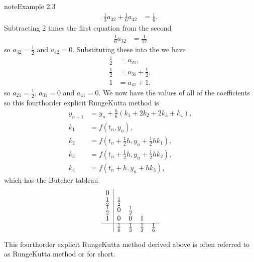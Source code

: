 \documentclass[letterpaper,10pt,english]{jupyterBook}
\begin{document}
\begin{sphinxadmonition}{note}{Example 2.3}
\begin{align*}
    \frac{1}{3}a_{32} + \frac{1}{6}a_{42} &= \frac{1}{6}.
\end{align*}
\sphinxAtStartPar
Subtracting 2 times the first equation from the second
\begin{align*}
    \frac{1}{6}a_{32} &= \frac{1}{12}
\end{align*}
\sphinxAtStartPar
so \(a_{32} = \frac{1}{2}\) and \(a_{42} = 0\). Substituting these into the {\hyperref[\detokenize{2_ERKs/2.2_RK4_Derivation:row-sum-condition}]{}} we have
\begin{align*}
    \frac{1}{2} &= a_{21}, \\
    \frac{1}{2} &= a_{31} + \frac{1}{2}, \\
    1 &= a_{41} + 1,
\end{align*}
\sphinxAtStartPar
so \(a_{21} = \frac{1}{2}\), \(a_{31} = 0\) and \(a_{41} = 0\). We now have the values of all of the coefficients so this fourth\sphinxhyphen{}order explicit Runge\sphinxhyphen{}Kutta method is
\begin{align*}
    y_{n+1} &=y_n +\frac{h}{6}(k_1 +2 k_2 +2k_3 +k_4 ),\\
    k_1 &=f(t_n ,y_n ),\\
    k_2 &=f(t_n +\tfrac{1}{2}h,y_n +\tfrac{1}{2}h k_1 ),\\
    k_3 &=f(t_n +\tfrac{1}{2}h,y_n +\tfrac{1}{2}h k_2 ),\\
    k_4 &=f(t_n +h,y_n +hk_3 ),
\end{align*}
\sphinxAtStartPar
which has the Butcher tableau
\begin{align*}
    \begin{array}{c|cccc}
        0 &  &  &  & \\
        \frac{1}{2} & \frac{1}{2} &  &  & \\
        \frac{1}{2} & 0 & \frac{1}{2} &  & \\
        1 & 0 & 0 & 1 & \\ \hline
        & \frac{1}{6} & \frac{1}{3} & \frac{1}{3} & \frac{1}{6}
    \end{array}
\end{align*}\end{sphinxadmonition}

\sphinxAtStartPar
This fourth\sphinxhyphen{}order explicit Runge\sphinxhyphen{}Kutta method derived above is often referred to as  Runge\sphinxhyphen{}Kutta method or  for short.
\end{document}
